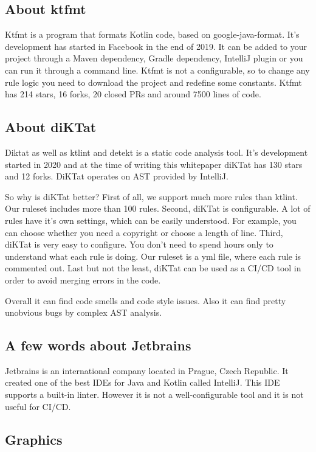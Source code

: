\subsection{About ktfmt}
\par Ktfmt is a program that formats Kotlin code, based on google-java-format. It's development has started in Facebook in the end of 2019. It can be added to your project through a Maven dependency, Gradle dependency, IntelliJ plugin or you can run it through a command line. Ktfmt is not a configurable, so to change any rule logic you need to download the project and redefine some constants. Ktfmt has 214 stars, 16 forks, 20 closed PRs and around 7500 lines of code. 

\subsection{About diKTat}
\par Diktat as well as ktlint and detekt is a static code analysis tool. It's development started in 2020 and at the time of writing this whitepaper diKTat has 130 stars and 12 forks. DiKTat operates on AST provided by IntelliJ. 
\par So why is diKTat better? First of all, we support much more rules than ktlint. Our ruleset includes more than 100 rules. Second, diKTat is configurable. A lot of rules have it's own settings, which can be easily understood. For example, you can choose whether you need a copyright or choose a length of line. Third, diKTat is very easy to configure. You don't need to spend hours only to understand what each rule is doing. Our ruleset is a yml file, where each rule is commented out. Last but not the least, diKTat can be used as a CI/CD tool in order to avoid merging errors in the code.
\par Overall it can find code smells and code style issues. Also it can find pretty unobvious bugs by complex AST analysis.

\subsection{A few words about Jetbrains}
\par Jetbrains is an international company located in Prague, Czech Republic. It created one of the best IDEs for Java and Kotlin called IntelliJ. This IDE supports a built-in linter. However it is not a well-configurable tool and it is not useful for CI/CD.

\subsection{Graphics}
